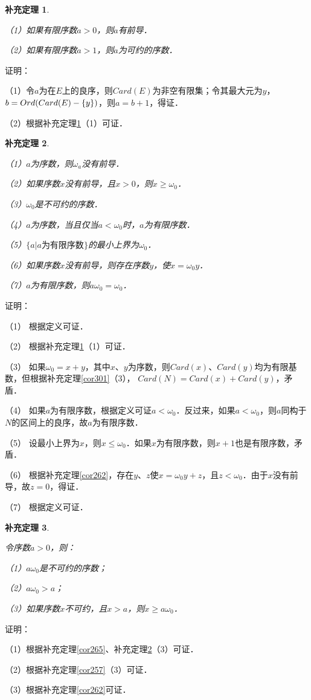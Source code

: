 \documentclass[12pt, a4paper, oneside]{book}
\newtheorem{cor}{补充定理}
\begin{document}
			\begin{cor}\label{cor348}
				\hfill\par
				（1）如果有限序数$a>0$，则$a$有前导．
				\par
				（2）如果有限序数$a>1$，则$a$为可约的序数．
			\end{cor}
			证明：
			\par
			（1）令$a$为在$E$上的良序，则$Card(E)$为非空有限集；令其最大元为$y$，$b=\\Ord(Card(E)-\{y\})$，则$a=b+1$，得证．
			\par
			（2）根据补充定理\ref{cor348}（1）可证．
			
			\begin{cor}\label{cor349}
				\hfill\par
				（1）$a$为序数，则$\omega_a$没有前导．
				\par
				（2）如果序数$x$没有前导，且$x>0$，则$x\geq \omega_0$．
				\par
				（3）$\omega_0$是不可约的序数．
				\par
				（4）$a$为序数，当且仅当$a<\omega_0$时，$a$为有限序数．
				\par
				（5）$\{a|a\text{为有限序数}\}$的最小上界为$\omega_0$．
				\par
				（6）如果序数$x$没有前导，则存在序数$y$，使$x=\omega_0y$．
				\par
				（7）$a$为有限序数，则$a\omega_0=\omega_0$．
			\end{cor}
			证明：
			\par
			（1）	根据定义可证．
			\par
			（2）	根据补充定理\ref{cor348}（1）可证．
			\par
			（3）	如果$\omega_0=x+y$，其中$x$、$y$为序数，则$Card(x)$、$Card(y)$均为有限基数，但根据补充定理\ref{cor301}（3）， $Card(N)=Card(x)+Card(y)$，矛盾．
			\par
			（4）	如果$a$为有限序数，根据定义可证$a<\omega_0$．反过来，如果$a<\omega_0$，则$a$同构于$N$的区间上的良序，故$a$为有限序数．
			\par
			（5）	设最小上界为$x$，则$x\leq \omega_0$．如果$x$为有限序数，则$x+1$也是有限序数，矛盾．
			\par
			（6）	根据补充定理\ref{cor262}，存在$y$、$z$使$x=\omega_0y+z$，且$z<\omega_0$．由于$x$没有前导，故$z=0$，得证．
			\par
			（7）	根据定义可证．
			
			\begin{cor}\label{cor350}
				\hfill\par
				令序数$a>0$，则：
				\par
				（1）$a\omega_0$是不可约的序数；
				\par
				（2）$a\omega_0>a$；
				\par
				（3）如果序数$x$不可约，且$x>a$，则$x\geq a\omega_0$．
			\end{cor}
			证明：
			\par
			（1）根据补充定理\ref{cor265}、补充定理\ref{cor349}（3）可证．
			\par
			（2）根据补充定理\ref{cor257}（3）可证．
			\par
			（3）根据补充定理\ref{cor262}可证．
			
\end{document}

